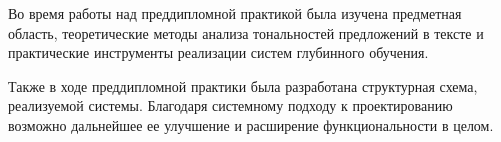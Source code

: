 
Во время работы над преддипломной практикой была изучена предметная область, теоретические методы анализа тональностей предложений в тексте и практические инструменты реализации систем глубинного обучения.

Также в ходе преддипломной практики была разработана структурная схема, реализуемой системы. Благодаря системному подходу к проектированию возможно дальнейшее ее улучшение и расширение функциональности в целом.
